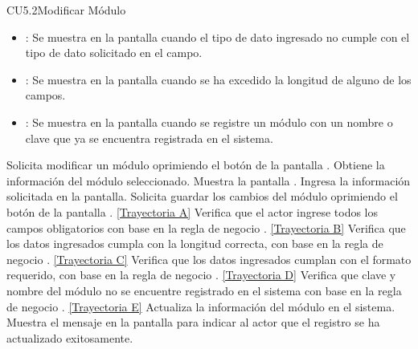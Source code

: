 \begin{UseCase}{CU5.2}{Modificar Módulo}
{\begin{itemize}
		\item {}: Se muestra en la pantalla  cuando el tipo de dato ingresado no cumple con el tipo de dato solicitado en
		el campo.
		\item {}: Se muestra en la pantalla  cuando se ha excedido la longitud de alguno de los campos.
		\item {}: Se muestra en la pantalla  cuando se registre un módulo con un nombre o clave que ya se encuentra registrada en el sistema.
		\end{itemize}
		}
	\end{UseCase}
	\begin{UCtrayectoria}
		\UCpaso[\UCactor] Solicita modificar un módulo oprimiendo el botón \editar de la pantalla .
		\UCpaso[\UCsist] Obtiene la información del módulo seleccionado.
		\UCpaso[\UCsist] Muestra la pantalla .
		\UCpaso[\UCactor] Ingresa la información solicitada en la pantalla. \label{CU5.2-P4}
		\UCpaso[\UCactor] Solicita guardar los cambios del módulo oprimiendo el botón  de la pantalla . \hyperlink{CU5-2:TAA}{[Trayectoria A]}
		\UCpaso[\UCsist] Verifica que el actor ingrese todos los campos obligatorios con base en la regla de negocio . \hyperlink{CU5-2:TAB}{[Trayectoria B]}
		\UCpaso[\UCsist] Verifica que los datos ingresados cumpla con la longitud correcta, con base en la regla de negocio . \hyperlink{CU5-2:TAC}{[Trayectoria C]}
		\UCpaso[\UCsist] Verifica que los datos ingresados cumplan con el formato requerido, con base en la regla de negocio . \hyperlink{CU5-2:TAD}{[Trayectoria D]}
		\UCpaso[\UCsist] Verifica que clave y nombre del módulo no se encuentre registrado en el sistema con base en la regla de negocio . \hyperlink{CU5-2:TAE}{[Trayectoria E]}
		\UCpaso[\UCsist] Actualiza la información del módulo en el sistema.
		\UCpaso[\UCsist] Muestra el mensaje  en la pantalla  para indicar al actor que el registro se ha actualizado exitosamente.
	\end{UCtrayectoria}		
	
